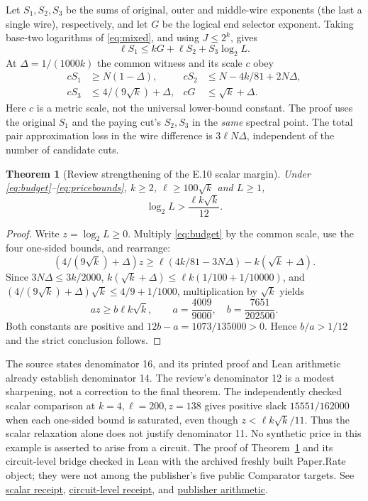 \documentclass[11pt,letterpaper]{article}
\newtheorem{theorem}{Theorem}[section]
\theoremstyle{definition}\newtheorem{definition}[theorem]{Definition}\newtheorem{example}[theorem]{Example}
\theoremstyle{remark}\newtheorem{remark}[theorem]{Remark}
\newcommand{\pub}[3]{\href{https://github.com/anthropics/formal-math/blob/11b6c7e3c927df2658f513b6b68ea7f8929c62c5/vp-vnp/#1\#L#2}{#3}}
\newcommand{\aud}[2]{\href{https://github.com/nousentllc/VP-VNP-Review/blob/567303d0bcf4f9d54390437b137752446e58ccd6/#1}{#2}}
\begin{document}
Let $S_1,S_2,S_3$ be the sums of original, outer and middle-wire exponents (the last a single wire), respectively, and let $G$ be the logical end selector exponent. Taking base-two logarithms of \eqref{eq:mixed}, and using $J\le2^k$, gives
\begin{equation}\label{eq:budget}
 \ell S_1\le kG+\ell S_2+S_3\log_2L.
\end{equation}
At $\Delta=1/(1000k)$ the common witness and its scale $c$ obey
\begin{align}
 cS_1&\ge N(1-\Delta), &cS_2&\le N-4k/81+2N\Delta,\label{eq:pricebounds}\\
 cS_3&\le4/(9\sqrt k)+\Delta, &cG&\le\sqrt k+\Delta.
\end{align}
Here $c$ is a metric scale, not the universal lower-bound constant. The proof uses the original $S_1$ and the paying cut's $S_2,S_3$ in the \emph{same} spectral point. The total pair approximation loss in the wire difference is $3\ell N\Delta$, independent of the number of candidate cuts.

\begin{theorem}[Review strengthening of the E.10 scalar margin]\label{thm:twelve}
Under \eqref{eq:budget}--\eqref{eq:pricebounds}, $k\ge2$, $\ell\ge100\sqrt k$ and $L\ge1$,
\[
 \log_2 L>\frac{\ell k\sqrt k}{12}.
\]
\end{theorem}
\begin{proof}
Write $z=\log_2 L\ge0$. Multiply \eqref{eq:budget} by the common scale, use the four one-sided bounds, and rearrange:
\[
 (4/(9\sqrt k)+\Delta)z
 \ge \ell(4k/81-3N\Delta)-k(\sqrt k+\Delta).
\]
Since $3N\Delta\le3k/2000$, $k(\sqrt k+\Delta)\le\ell k(1/100+1/10000)$, and $(4/(9\sqrt k)+\Delta)\sqrt k\le4/9+1/1000$, multiplication by $\sqrt k$ yields
\[
 az\ge b\ell k\sqrt k,\qquad
 a=\frac{4009}{9000},\quad b=\frac{7651}{202500}.
\]
Both constants are positive and $12b-a=1073/135000>0$. Hence $b/a>1/12$ and the strict conclusion follows.
\end{proof}
The source states denominator 16, and its printed proof and Lean arithmetic already establish denominator 14. The review's denominator 12 is a modest sharpening, not a correction to the final theorem. The independently checked scalar comparison at $k=4,\ell=200,z=138$ gives positive slack $15551/162000$ when each one-sided bound is saturated, even though $z<\ell k\sqrt k/11$. Thus the scalar relaxation alone does not justify denominator 11. No synthetic price in this example is asserted to arise from a circuit. The proof of Theorem~\ref{thm:twelve} and its circuit-level bridge checked in Lean with the archived freshly built Paper.Rate object; they were not among the publisher's five public Comparator targets. See \aud{checks/pass14a_margin_results.json}{scalar receipt}, \aud{checks/pass14a_circuit_results.json}{circuit-level receipt}, and \pub{Paper/Rate.lean}{123}{publisher arithmetic}.
\end{document}
